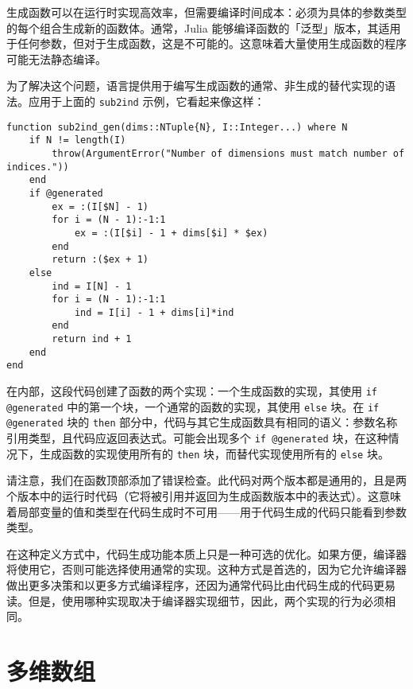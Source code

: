 生成函数可以在运行时实现高效率，但需要编译时间成本：必须为具体的参数类型的每个组合生成新的函数体。通常，Julia 能够编译函数的「泛型」版本，其适用于任何参数，但对于生成函数，这是不可能的。这意味着大量使用生成函数的程序可能无法静态编译。



为了解决这个问题，语言提供用于编写生成函数的通常、非生成的替代实现的语法。应用于上面的 \texttt{sub2ind} 示例，它看起来像这样：




\begin{verbatim}
function sub2ind_gen(dims::NTuple{N}, I::Integer...) where N
    if N != length(I)
        throw(ArgumentError("Number of dimensions must match number of indices."))
    end
    if @generated
        ex = :(I[$N] - 1)
        for i = (N - 1):-1:1
            ex = :(I[$i] - 1 + dims[$i] * $ex)
        end
        return :($ex + 1)
    else
        ind = I[N] - 1
        for i = (N - 1):-1:1
            ind = I[i] - 1 + dims[i]*ind
        end
        return ind + 1
    end
end
\end{verbatim}



在内部，这段代码创建了函数的两个实现：一个生成函数的实现，其使用 \texttt{if @generated} 中的第一个块，一个通常的函数的实现，其使用 \texttt{else} 块。在 \texttt{if @generated} 块的 \texttt{then} 部分中，代码与其它生成函数具有相同的语义：参数名称引用类型，且代码应返回表达式。可能会出现多个 \texttt{if @generated} 块，在这种情况下，生成函数的实现使用所有的 \texttt{then} 块，而替代实现使用所有的 \texttt{else} 块。



请注意，我们在函数顶部添加了错误检查。此代码对两个版本都是通用的，且是两个版本中的运行时代码（它将被引用并返回为生成函数版本中的表达式）。这意味着局部变量的值和类型在代码生成时不可用——用于代码生成的代码只能看到参数类型。



在这种定义方式中，代码生成功能本质上只是一种可选的优化。如果方便，编译器将使用它，否则可能选择使用通常的实现。这种方式是首选的，因为它允许编译器做出更多决策和以更多方式编译程序，还因为通常代码比由代码生成的代码更易读。但是，使用哪种实现取决于编译器实现细节，因此，两个实现的行为必须相同。



\hypertarget{12380164357355707963}{}


\chapter{多维数组}



